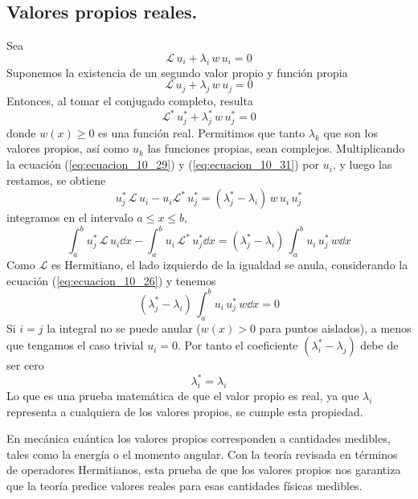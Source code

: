 \subsection{Valores propios reales.}
Sea
\begin{equation}
\mathcal{L} \, u_{i} + \lambda_{i} \, w \, u_{i} = 0
\label{eq:ecuacion_10_29}
\end{equation}
Suponemos la existencia de un segundo valor propio y función propia
\begin{equation}
\mathcal{L} \, u_{j} + \lambda_{j} \, w \, u_{j} = 0
\label{eq:ecuacion_10_30}
\end{equation}
Entonces, al tomar el conjugado completo, resulta
\begin{equation}
\mathcal{L}^{*} \, u_{j}^{*} + \lambda_{j}^{*} \, w \, u_{j}^{*} = 0
\label{eq:ecuacion_10_31}
\end{equation}
donde $w(x) \geq 0$ es una función real. Permitimos que tanto $\lambda_{k}$ que son los valores propios, así como $u_{k}$ las funciones propias, sean complejos. Multiplicando la ecuación (\ref{eq:ecuacion_10_29}) y (\ref{eq:ecuacion_10_31}) por $u_{i}$, y luego las restamos, se obtiene
\begin{equation}
u_{j}^{*} \, \mathcal{L} \, u_{i} - u_{i} \mathcal{L}^{*} \, u_{j}^{*} =  (\lambda_{j}^{*} - \lambda_{i}) \, w \, u_{i} \, u_{j}^{*}
\label{eq:ecuacion_10_32}
\end{equation}
integramos en el intervalo $a \leq x \leq b$,
\begin{equation}
\int_{a}^{b} u_{j}^{*} \, \mathcal{L} \, u_{i} \dd{x} - \int_{a}^{b} u_{i} \, \mathcal{L}^{*} \, u_{j}^{*} \dd{x} = (\lambda_{j}^{*} - \lambda_{i}) \, \int_{a}^{b}  u_{i} \, u_{j}^{*} \, w \dd{x}
\label{eq:ecuacion_10_33}
\end{equation}
Como $\mathcal{L}$ es Hermitiano, el lado izquierdo de la igualdad se anula, considerando la ecuación (\ref{eq:ecuacion_10_26}) y tenemos
\begin{equation}
(\lambda_{j}^{*} - \lambda_{i}) \, \int_{a}^{b}  u_{i} \, u_{j}^{*} \, w \dd{x} = 0
\label{eq:ecuacion_10_34}
\end{equation}
Si $i=j$ la integral no se puede anular ($w(x) > 0$ para puntos aislados), a menos que tengamos el caso trivial $u_{i} = 0$. Por tanto el coeficiente $(\lambda_{i}^{*} - \lambda_{j})$ debe de ser cero
\begin{equation}
\lambda_{i}^{*} = \lambda_{i}
\label{eq:ecuacion_10_35}
\end{equation}
Lo que es una prueba matemática de que el valor propio es real, ya que $\lambda_{i}$ representa a cualquiera de los valores propios, se cumple esta propiedad.
\par
En mecánica cuántica los valores propios corresponden a cantidades medibles, tales como la energía o el momento angular. Con la teoría revisada en términos de operadores Hermitianos, esta prueba de que los valores propios nos garantiza que la teoría predice valores reales para esas cantidades físicas medibles.
